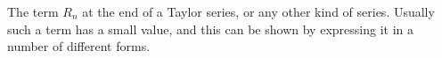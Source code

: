 The term $R_{n}$  at the end of a Taylor series, or any other kind of series.
Usually such a term has a small value, and this can be shown by expressing
it in a number of different forms.